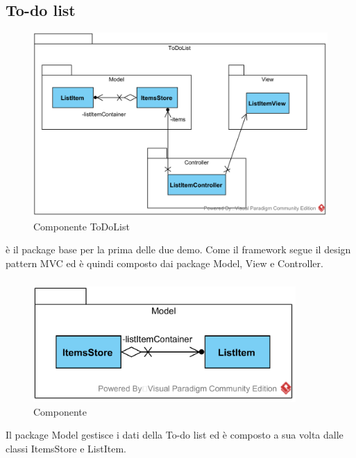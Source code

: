 \subsection{To-do list} \label{To-do list}
\begin{figure}[H]
	\centering
	\includegraphics[width=14cm]{./diagrammi/todo/todo.png}
	\caption{Componente ToDoList}
\end{figure}
 è il package base per la prima delle due demo. Come il framework segue il design pattern MVC ed è quindi composto dai package Model, View e Controller.

\subsubsection[::Model]{\class} \label{\class}
\begin{figure}[H]
	\centering
	\includegraphics[width=10cm]{./diagrammi/todo/todomodel.png}
	\caption{Componente \class}
\end{figure}
Il package Model gestisce i dati della To-do list ed è composto a sua volta dalle classi ItemsStore e ListItem.


